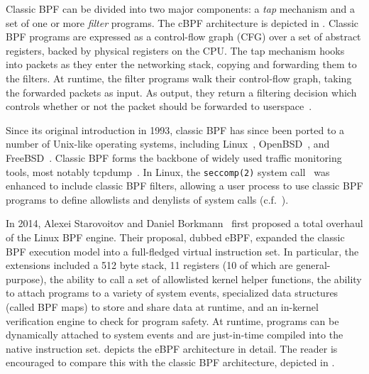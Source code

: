 Classic BPF can be divided into two major components: a \textit{tap} mechanism and a set
of one or more \textit{filter} programs. The cBPF architecture is depicted in
. Classic BPF programs are expressed as a control-flow graph (CFG)
over a set of abstract registers, backed by physical registers on the CPU. The tap
mechanism hooks into packets as they enter the networking stack, copying and forwarding
them to the filters. At runtime, the filter programs walk their control-flow graph, taking
the forwarded packets as input. As output, they return a filtering decision which controls
whether or not the packet should be forwarded to userspace~\cite{mccanne1993_bpf}.

Since its original introduction in 1993, classic BPF has since been ported to a number of
Unix-like operating systems, including Linux~\cite{linux_bpf}, OpenBSD~\cite{openbsd_bpf},
and FreeBSD~\cite{freebsd_bpf}. Classic BPF forms the backbone of widely used traffic
monitoring tools, most notably tcpdump~\cite{tcpdump, mccanne1993_bpf}. In Linux, the
\texttt{seccomp(2)} system call~ was enhanced to include classic BPF
filters, allowing a user process to use classic BPF programs to define allowlists and
denylists of system calls (c.f.~).

In 2014, Alexei Starovoitov and Daniel Borkmann~\cite{starovoitov2014_ebpf} first proposed
a total overhaul of the Linux BPF engine. Their proposal, dubbed eBPF, expanded the
classic BPF execution model into a full-fledged virtual instruction set. In particular,
the extensions included a 512 byte stack, 11 registers (10 of which are general-purpose),
the ability to call a set of allowlisted kernel helper functions, the ability to attach
programs to a variety of system events, specialized data structures (called BPF maps) to
store and share data at runtime, and an in-kernel verification engine to check for program
safety. At runtime, programs can be dynamically attached to system events and are
just-in-time compiled into the native instruction set.   depicts
the eBPF architecture in detail. The reader is encouraged to compare this with the classic
BPF architecture, depicted in .

